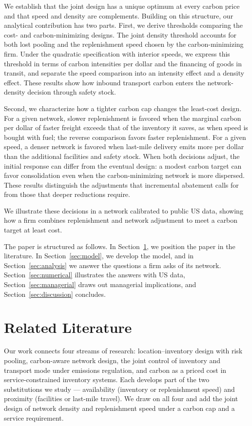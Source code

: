 \documentclass[11pt]{article}
\numberwithin{proposition}{section}
\theoremstyle{definition}
\theoremstyle{remark}
\theoremstyle{plain}
\begin{document}
We establish that the joint design has a unique optimum at every carbon price and that speed and density are
complements. Building on this structure, our analytical contribution has two parts. First, we derive thresholds
comparing the cost- and carbon-minimizing designs. The joint density threshold accounts for both lost pooling
and the replenishment speed chosen by the carbon-minimizing firm. Under the quadratic specification with interior
speeds, we express this threshold in terms of carbon intensities per dollar and the financing of goods in
transit, and separate the speed comparison into an intensity effect and a density effect. These results show
how inbound transport carbon enters the network-density decision through safety stock.

Second, we characterize how a tighter carbon cap changes the least-cost design. For a given network, slower
replenishment is favored when the marginal carbon per dollar of faster freight exceeds that of the inventory it
saves, as when speed is bought with fuel; the reverse comparison favors faster replenishment. For a given speed, a
denser network is favored when last-mile delivery emits more per dollar than the additional facilities and safety
stock. When both decisions adjust, the initial response can differ from the eventual design: a modest carbon target
can favor consolidation even when the carbon-minimizing network is more dispersed. These results distinguish the
adjustments that incremental abatement calls for from those that deeper reductions require.

We illustrate these decisions in a network calibrated to public US data, showing how a firm combines replenishment
and network adjustment to meet a carbon target at least cost.

The paper is structured as follows. In Section~\ref{sec:related}, we position the paper in the literature. In
Section~\ref{sec:model}, we develop the model, and in Section~\ref{sec:analysis} we answer the questions a
firm asks of its network.
Section~\ref{sec:numerical} illustrates the answers with US data, Section~\ref{sec:managerial} draws out managerial
implications, and Section~\ref{sec:discussion} concludes.

\section{Related Literature}\label{sec:related}

Our work connects four streams of research: location--inventory design with risk pooling, carbon-aware network
design, the joint control of inventory and transport mode under emissions regulation, and carbon as a priced cost
in service-constrained inventory systems. Each develops part of the two substitutions we study --- availability
(inventory or replenishment speed) and proximity (facilities or last-mile travel). We draw on all four and add the
joint design of network density and replenishment speed under a carbon cap and a service requirement.
\end{document}
